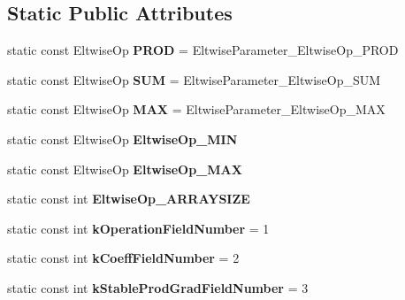 \subsection*{Static Public Attributes}
\begin{DoxyCompactItemize}
\item 
\mbox{\label{classcaffe_1_1_eltwise_parameter_a9ee80fc12563c0d1bca6139c5462c8f2}} 
static const Eltwise\+Op {\bfseries P\+R\+OD} = Eltwise\+Parameter\+\_\+\+Eltwise\+Op\+\_\+\+P\+R\+OD
\item 
\mbox{\label{classcaffe_1_1_eltwise_parameter_a01158b7ac63ddbb9fc7e64ae45d28c6a}} 
static const Eltwise\+Op {\bfseries S\+UM} = Eltwise\+Parameter\+\_\+\+Eltwise\+Op\+\_\+\+S\+UM
\item 
\mbox{\label{classcaffe_1_1_eltwise_parameter_afe5f946e10c3bfb41939eca21836beb6}} 
static const Eltwise\+Op {\bfseries M\+AX} = Eltwise\+Parameter\+\_\+\+Eltwise\+Op\+\_\+\+M\+AX
\item 
static const Eltwise\+Op {\bfseries Eltwise\+Op\+\_\+\+M\+IN}
\item 
static const Eltwise\+Op {\bfseries Eltwise\+Op\+\_\+\+M\+AX}
\item 
static const int {\bfseries Eltwise\+Op\+\_\+\+A\+R\+R\+A\+Y\+S\+I\+ZE}
\item 
\mbox{\label{classcaffe_1_1_eltwise_parameter_a7a69d9eb60090a286e3ecc09760a0ae4}} 
static const int {\bfseries k\+Operation\+Field\+Number} = 1
\item 
\mbox{\label{classcaffe_1_1_eltwise_parameter_ae9f05a8f34af9b2ec70c12db53e49867}} 
static const int {\bfseries k\+Coeff\+Field\+Number} = 2
\item 
\mbox{\label{classcaffe_1_1_eltwise_parameter_aa532ff47ae32118e105de3a9a35daca8}} 
static const int {\bfseries k\+Stable\+Prod\+Grad\+Field\+Number} = 3
\end{DoxyCompactItemize}
